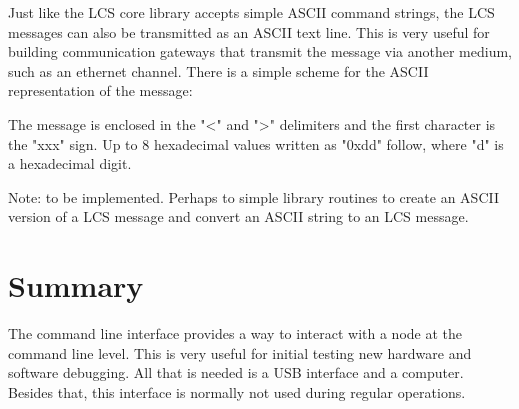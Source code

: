 Just like the LCS core library accepts simple ASCII command strings, the LCS messages can also be transmitted as an ASCII text line. This is very useful for building communication gateways that transmit the message via another medium, such as an ethernet channel. There is a simple scheme for the ASCII representation of the message:

%

The message is enclosed in the "<" and ">" delimiters and the first character is the "xxx" sign. Up to 8 hexadecimal values written as "0xdd" follow, where "d" is a hexadecimal digit.



Note: to be implemented. Perhaps to simple library routines to create an ASCII version of a LCS message and convert an ASCII string to an LCS message.

\section{Summary}

The command line interface provides a way to interact with a node at the command line level. This is very useful for initial testing new hardware and software debugging. All that is needed is a USB interface and a computer. Besides that, this interface is normally not used during regular operations.